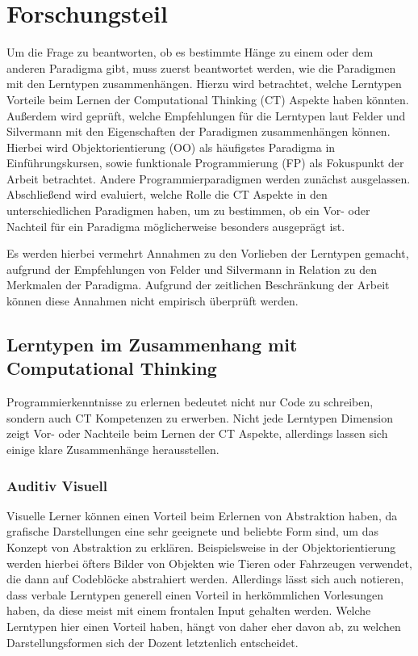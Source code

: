 \clearpage
\section{Forschungsteil}
\label{sec:work}

Um die Frage zu beantworten, ob es bestimmte Hänge zu einem oder dem anderen Paradigma gibt, muss zuerst beantwortet werden, wie die Paradigmen mit den Lerntypen zusammenhängen. 
Hierzu wird betrachtet, welche Lerntypen Vorteile beim Lernen der Computational Thinking (CT) Aspekte haben könnten. Außerdem wird geprüft, welche Empfehlungen für die Lerntypen laut Felder und Silvermann mit den Eigenschaften der Paradigmen zusammenhängen können. Hierbei wird Objektorientierung (OO) als häufigstes Paradigma in Einführungskursen, sowie funktionale Programmierung (FP) als Fokuspunkt der Arbeit betrachtet. Andere Programmierparadigmen werden zunächst ausgelassen. Abschließend wird evaluiert, welche Rolle die CT Aspekte in den unterschiedlichen Paradigmen haben, um zu bestimmen, ob ein Vor- oder Nachteil für ein Paradigma möglicherweise besonders ausgeprägt ist.

Es werden hierbei vermehrt Annahmen zu den Vorlieben der Lerntypen gemacht, aufgrund der Empfehlungen von Felder und Silvermann in Relation zu den Merkmalen der Paradigma. Aufgrund der zeitlichen Beschränkung der Arbeit können diese Annahmen nicht empirisch überprüft werden.

\subsection{Lerntypen im Zusammenhang mit Computational Thinking}
Programmierkenntnisse zu erlernen bedeutet nicht nur Code zu schreiben, sondern auch CT Kompetenzen zu erwerben.
Nicht jede Lerntypen Dimension zeigt Vor- oder Nachteile beim Lernen der CT Aspekte, allerdings lassen sich einige klare Zusammenhänge herausstellen.

\subsubsection{Auditiv Visuell}
Visuelle Lerner können einen Vorteil beim Erlernen von Abstraktion haben, da grafische Darstellungen eine sehr geeignete und beliebte Form sind, um das Konzept von Abstraktion zu erklären. Beispielsweise in der Objektorientierung werden hierbei öfters Bilder von Objekten wie Tieren oder Fahrzeugen verwendet, die dann auf Codeblöcke abstrahiert werden.
Allerdings lässt sich auch notieren, dass verbale Lerntypen generell einen Vorteil in herkömmlichen Vorlesungen haben, da diese meist mit einem frontalen Input gehalten werden. Welche Lerntypen hier einen Vorteil haben, hängt von daher eher davon ab, zu welchen Darstellungsformen sich der Dozent letztenlich entscheidet. %

